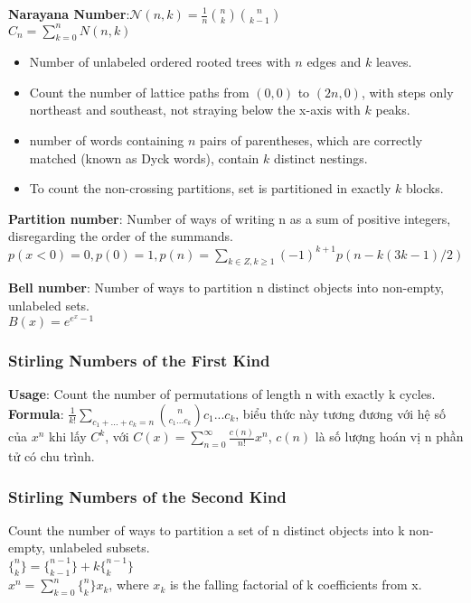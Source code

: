 \textbf{Narayana Number}:$\mathcal{N}(n, k) = \frac{1}{n}\binom{n}{k}\binom{n}{k-1}$ \\
$C_n = \sum_{k=0}^n N(n, k)$
\begin{itemize}
    \item Number of unlabeled ordered rooted trees with ${\displaystyle n}$ edges and ${\displaystyle k}$ leaves.
    \item Count the number of lattice paths from $(0,0)$ to $(2n,0)$, with steps only northeast and southeast, not straying below the x-axis with ⁠$k$⁠ peaks. %
    \item number of words containing ⁠${\displaystyle n}$⁠ pairs of parentheses, which are correctly matched (known as Dyck words), contain ⁠${\displaystyle k}$⁠ distinct nestings.
    \item To count the non-crossing partitions, set is partitioned in exactly $⁠{\displaystyle k}$⁠ blocks.
\end{itemize}

\textbf{Partition number}: Number of ways of writing n as a sum of positive integers, disregarding the order of the summands. \\ $p(x<0)=0, p(0)=1,p(n) = \sum_{k \in Z, k\ge1} (-1)^{k+1}p(n - k(3k-1)/2)$

\textbf{Bell number}: Number of ways to partition n distinct objects into non-empty, unlabeled sets. \\ $B(x) = e^{e^x - 1}$

\subsubsection{Stirling Numbers of the First Kind}
\textbf{Usage}: Count the number of permutations of length n with exactly k cycles. \\
\textbf{Formula}: $\frac{1}{k!} \sum_{c_1+...+ c_k = n}\binom{n}{c_1 ...c_k}c_1...c_k$, biểu thức này tương đương với hệ số của $x^n$ khi lấy $C^k$, với $C(x) =  \sum_{n=0}^\infty \frac{c(n)}{n!}x^n$, $c(n)$ là số lượng hoán vị n phần tử có chu trình. 


\subsubsection{Stirling Numbers of the Second Kind}
Count the number of ways to partition a set of n distinct objects into k non-empty, unlabeled subsets.
\\ $\{^n_k\} = \{^{n-1}_{k-1}\} + k \{^{n-1}_{k}\}$
\\ $x^n = \sum_{k=0}^n\{^n_k\}x_k$, where $x_k$ is the falling factorial of k coefficients from x.



